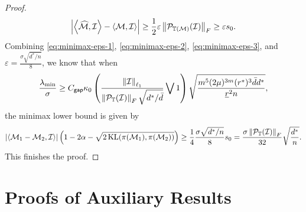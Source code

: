 \documentclass[12pt]{article}
\newcommand{\tF}{{\rm F}}
\newcommand{\abs}[1]{\left\lvert#1\right\rvert}
\newcommand{\norm}[1]{\left\lVert#1\right\rVert}
\newcommand{\cP}{\mathcal{P}}
\newcommand{\cM}{\mathcal{M}}
\newcommand{\cI}{\mathcal{I}}
\def\TT{{\mathbb T}}
\newcommand{\gap}{{\mathsf{gap} }}
\newcommand{\dmax}{\bar{d}}
\theoremstyle{plain}
\begin{document}
\begin{proof}
\begin{equation*}
      \abs{\left\langle \widehat{\cM},\cI \right\rangle-\left\langle\cM ,\cI \right\rangle} \ge \frac{1}{2}\varepsilon \norm{\cP_{\TT(\cM)}(\cI)}_{\tF} \ge \varepsilon s_0.
\end{equation*}
Combining \eqref{eq:minimax-eps-1}, \eqref{eq:minimax-eps-2}, \eqref{eq:minimax-eps-3}, and $\varepsilon=\frac{\sigma\sqrt{d^*/n}}{8}$, we know that when 
\begin{equation*}
     \frac{\lambda_{\min}}{\sigma} \ge C_{\gap} \kappa_0\left(\frac{\norm{\cI}_{\ell_1}}{ \norm{\cP_{\TT}(\cI)}_{\tF}\sqrt{d^*/\dmax} }\bigvee 1\right) \sqrt{\frac{ m^5 (2\mu)^{3 m} (r^*)^{3 }\dmax d^* }{\underline{r}^2  n } },
\end{equation*}
the minimax lower bound is given by
\begin{equation*}
    \abs{\left\langle \cM_1-\cM_2,\cI\right\rangle} \left(1-2\alpha-\sqrt{2\operatorname{KL}(\pi(\cM_1),\pi(\cM_2))} \right) \ge  \frac{1}{4}\frac{\sigma\sqrt{d^*/n}}{8} s_0 = \frac{\sigma \norm{\cP_{\TT}(\cI)}_{\tF}}{32}\sqrt{\frac{d^*}{n}}.
\end{equation*}
This finishes the proof.
\end{proof}

\section{Proofs of Auxiliary Results}
\end{document}
